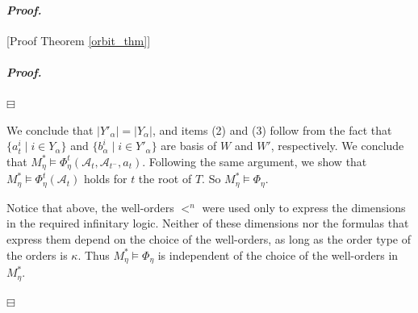 \documentclass[12pt,a4paper]{amsart}
\theoremstyle{definition}
\theoremstyle{remark}
\renewcommand{\mid}{\mathrel{|}\allowbreak}
\newenvironment{cproof}{\paragraph{\emph{Proof.\,}}}{\hfill{$\boxminus$}\par\vspace{2mm}}
\begin{document}
\begin{cproof}[Proof Theorem \ref{orbit_thm}]
\begin{cproof}
     
 \end{cproof}

We conclude that $|Y'_\alpha|=|Y_\alpha|$, and items (2) and (3) follow from the fact that $\{a_t^i\mid i\in Y_\alpha\}$ and $\{b_\alpha^i\mid i\in Y'_\alpha\}$ are basis of $W$ and $W'$, respectively. We conclude that $M_\eta^*\models\Phi_\eta^t(\mathcal{A}_t,\mathcal{A}_{t^-},a_t)$.
Following the same argument, we show that $M_\eta^*\models \Phi_\eta^t(\mathcal{A}_t)$ holds for $t$ the root of $T$. So  $M_\eta^*\models \Phi_\eta$.

Notice that above, the well-orders $<^n$ were used only to express the dimensions in the required infinitary logic. Neither of these dimensions nor the formulas that express them depend on the choice of the well-orders, as long as the order type of the orders is $\kappa$. Thus $M^*_\eta\models\Phi_\eta$ is independent of the choice of the well-orders in $M^*_\eta$.


\end{cproof}
\end{document}
